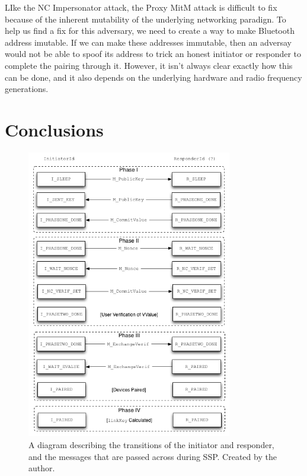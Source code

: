 \documentclass{acm_proc_article-sp}
\begin{document}
LIke the NC Impersonator attack, the Proxy MitM attack is difficult to fix because of the inherent mutability of the underlying networking paradign. To help us find a fix for this adversary, we need to create a way to make Bluetooth address imutable. If we can make these addresses immutable, then an adversay would not be able to spoof its address to trick an honest initiator or responder to complete the pairing through it. However, it isn't always clear exactly how this can be done, and it also depends on the underlying hardware and radio frequency generations.

\section{Conclusions}

\nocite{*}


\begin{figure}
    \begin{center}
        \includegraphics[width=0.8\textwidth]{diagrams/transitions.png}
        \caption{A diagram describing the transitions of the initiator and responder, and the messages that are passed across during SSP. Created by the author.}
        \label{transitions}
    \end{center}
\end{figure}
\end{document}
